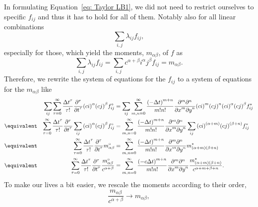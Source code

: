 In formulating Equation~\eqref{eq: Taylor LB1}, we did not need to restrict ourselves to specific $f_{ij}$ and thus it has to hold for all of them. Notably also for all linear combinations
\begin{equation*}
  \sum_{i,j}\lambda_{ij} f_{ij},
\end{equation*}
especially for those, which yield the moments, $m_{\alpha\beta} $, of $f$ as
\begin{equation}
  \sum_{i,j}\lambda_{ij} f_{ij} = \sum_{i,j}c^{\alpha + \beta}i^\alpha j^\beta f_{ij}=m_{\alpha\beta}.
\end{equation}
Therefore, we rewrite the system of equations for the $f_{ij}$ to a system of equations for the $m_{\alpha\beta}$ like
\begin{align}
    \nonumber
    & & \sum_{ij} \sum_{\tau = 0}^\infty \frac{{\Delta t}^\tau }{\tau!} \frac{\partial^\tau}{{\partial t}^\tau} {(ci)}^\alpha {(cj)}^\beta f_{ij}^{\circ}
    &=
    \sum_{ij}\sum_{m,n = 0}^\infty \frac{{(-\Delta t)}^{m+n}} {m!n!} \frac{\partial^m \partial^n}{ {\partial x}^m{\partial y}^n} {(ci)}^m {(cj)}^n {(ci)}^\alpha {(cj)}^\beta f^*_{ij}
    \\ \nonumber &\equivalent &
    \sum_{\tau = 0}^\infty \frac{{\Delta t}^\tau }{\tau!} \frac{\partial^\tau}{{\partial t}^\tau} \sum_{ij}{(ci)}^\alpha {(cj)}^\beta f_{ij}^{\circ}
    &=
    \sum_{m,n = 0}^\infty \frac{{(-\Delta t)}^{m+n}} {m!n!} \frac{\partial^m \partial^n}{ {\partial x}^m{\partial y}^n}\sum_{ij}{(ci)}^{(\alpha+m)} {(cj)}^{(\beta+n)} f^*_{ij}
    \\ \nonumber &\equivalent &
     \sum_{\tau = 0}^\infty \frac{{\Delta t}^\tau }{\tau!} \frac{\partial^\tau}{{\partial t}^\tau} m_{\alpha\beta}^{\circ} &=
    \sum_{m,n = 0}^\infty \frac{{(-\Delta t)}^{m+n}} {m!n!} \frac{\partial^m \partial^n}{ {\partial x}^m{\partial y}^n} m^*_{(\alpha + m)(\beta + n)}
     \\   &\equivalent &
     \sum_{\tau = 0}^\infty \frac{{\Delta t}^\tau }{\tau!} \frac{\partial^\tau}{{\partial t}^\tau} \frac{m_{\alpha\beta}^{\circ}}{c^{\alpha + \beta}} &=
    \sum_{m,n = 0}^\infty \frac{{(- c\Delta t)}^{m+n}} {m!n!} \frac{\partial^m \partial^n}{ {\partial x}^m{\partial y}^n} \frac{m^*_{(\alpha + m)(\beta + n)}}{c^{\alpha + m + \beta + n}}.
\end{align}
To make our lives a bit easier, we rescale the moments according to their order,
\begin{equation}
  \label{eq: rescaling the moments}
  \frac{m_{\alpha\beta}}{c^{\alpha + \beta}} \rightarrow m_{\alpha\beta},
\end{equation}
